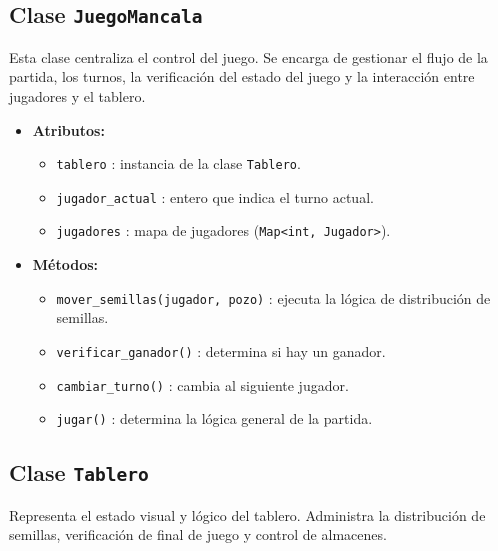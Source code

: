 \documentclass{article}
\begin{document}
\subsection*{Clase \texttt{JuegoMancala}}

Esta clase centraliza el control del juego. Se encarga de gestionar el flujo de la partida, los turnos, la verificación del estado del juego y la interacción entre jugadores y el tablero.

\begin{itemize}
  \item \textbf{Atributos:}
  \begin{itemize}
    \item \texttt{tablero} : instancia de la clase \texttt{Tablero}.
    \item \texttt{jugador\_actual} : entero que indica el turno actual.
    \item \texttt{jugadores} : mapa de jugadores (\texttt{Map<int, Jugador>}).
  \end{itemize}
  
  \item \textbf{Métodos:}
  \begin{itemize}
    \item \texttt{mover\_semillas(jugador, pozo)} : ejecuta la lógica de distribución de semillas.
    \item \texttt{verificar\_ganador()} : determina si hay un ganador.
    \item \texttt{cambiar\_turno()} : cambia al siguiente jugador.
    \item \texttt{jugar()} : determina la lógica general de la partida.
  \end{itemize}
\end{itemize}

\subsection*{Clase \texttt{Tablero}}

Representa el estado visual y lógico del tablero. Administra la distribución de semillas, verificación de final de juego y control de almacenes.
\end{document}
